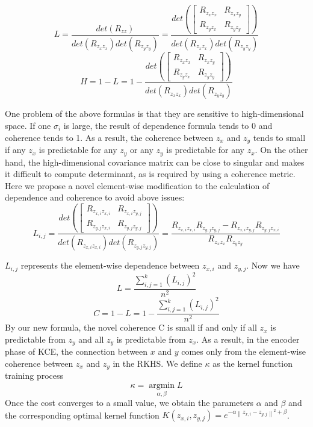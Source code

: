 \documentclass[12pt]{report} %
\newcommand{\norm}[1]{\left\lVert #1 \right\rVert}
\begin{document}
\begin{equation}
L=\frac{det(R_{zz})}
{det(R_{z_{x}z_{x}})det(R_{z_{y}z_{y}})}=\frac{det\left(\begin{bmatrix}
	R_{z_{x}z_{x}} & R_{z_{x}z_{y}} \\
	R_{z_{y}z_{x}} & R_{z_{y}z_{y}}
	\end{bmatrix}\right)}
{det(R_{z_{x}z_{x}})det(R_{z_{y}z_{y}})}
\end{equation}
\begin{equation}
H=1-L=1-\frac{det\left(\begin{bmatrix}
	R_{z_{x}z_{x}} & R_{z_{x}z_{y}} \\
	R_{z_{y}z_{x}} & R_{z_{y}z_{y}}
	\end{bmatrix}\right)}
{det(R_{z_{x}z_{x}})det(R_{z_{y}z_{y}})}
\end{equation}

One problem of the above formulas is that they are sensitive to high-dimensional space. If one \(\sigma_i\) is large, the result of dependence formula tends to 0 and coherence tends to 1. As a result, the coherence between $z_x$ and $z_y$ tends to small if any $z_x$ is predictable for any $z_y$ or any $z_y$ is predictable for any $z_x$. On the other hand, the high-dimensional covariance matrix can be close to singular and makes it difficult to compute determinant, as is required by using a coherence metric. Here we propose a novel element-wise modification to the calculation of dependence and coherence to avoid above issues:
\begin{equation}
L_{i,j}=\frac{det\left(\begin{bmatrix}
	R_{z_{x,i}z_{x,i}} & R_{z_{x,i}z_{y,j}} \\
	R_{z_{y,j}z_{x,i}} & R_{z_{y,j}z_{y,j}}
	\end{bmatrix}\right)}
{det(R_{z_{x,i}z_{x,i}})det(R_{z_{y,j}z_{y,j}})}=
\frac{R_{z_{x,i}z_{x,i}}R_{z_{y,j}z_{y,j}}-R_{z_{x,i}z_{y,j}}R_{z_{y,j}z_{x,i}}}
{R_{z_{x}z_{x}}R_{z_{y}z_{y}}}
\end{equation}

\(L_{i,j}\) represents the element-wise dependence between $z_{x,i}$ and $z_{y,j}$. Now we have
\begin{equation}
L=\frac{\sum_{i,j=1}^{k}(L_{i,j})^2}{n^2}
\end{equation}
\begin{equation}
C=1-L=1-\frac{\sum_{i,j=1}^{k}(L_{i,j})^2}{n^2}
\end{equation}
By our new formula, the novel coherence C is small if and only if all $z_x$ is predictable from $z_y$ and all $z_y$ is predictable from $z_x$. As a result, in the encoder phase of KCE, the connection between $x$ and $y$ comes only from the element-wise coherence between $z_x$ and $z_y$ in the RKHS. We define $\kappa$ as the kernel function training process
\begin{equation}
\kappa=\operatorname*{argmin}_{\alpha,\beta} L
\end{equation}
Once the cost converges to a small value, we obtain the parameters $\alpha$ and $\beta$ and the corresponding optimal kernel function $K(z_{x,i},z_{y,j})=e^{-\alpha \norm{z_{x,i}-z_{y,j}}^2 + \beta}$.
\end{document}
